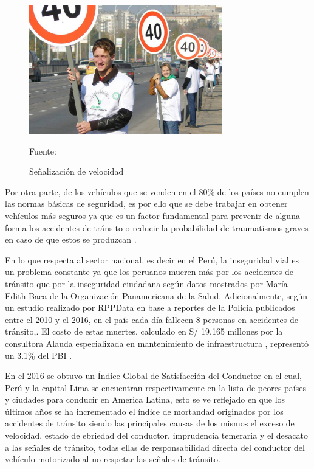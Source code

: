 	\vskip 0.15cm
	\begin{figure}[H]
	\begin{center}
	\includegraphics[width=0.75\textwidth]{images/intro/velocidad}
	\end{center}
	\begin{center}
	\caption{\small{Señalización de velocidad}}
	{\small{Fuente: \cite{OMS}}}
	\end{center}
	\vspace{-1.5em}
	\end{figure}
	
	Por otra parte, de los vehículos que se venden en el 80\% de los países no cumplen las normas básicas de seguridad, es por ello que se debe trabajar en obtener vehículos más seguros ya que es un factor fundamental para prevenir de alguna forma los accidentes de tránsito o reducir la probabilidad de traumatismos graves en caso de que estos se produzcan \citep{OMS}.
	
	\vskip 0.15cm
	En lo que respecta al sector nacional, es decir en el Perú, la inseguridad vial es un problema constante ya que los peruanos mueren más por los accidentes de tránsito que por la inseguridad ciudadana según datos mostrados por María Edith Baca de la Organización Panamericana de la Salud\citep{OPS}. Adicionalmente, según un estudio realizado por RPPData en base a reportes de la Policía publicados entre el 2010 y el 2016, en el país cada día fallecen 8 personas en accidentes de tránsito,\citep{RPPData}. El costo de estas muertes, calculado en S/ 19,165 millones por la consultora Alauda especializada en mantenimiento de infraestructura , representó un 3.1\% del PBI \citep{Gestion2}.  
	
	
	\vskip 0.15cm
	En el 2016 se obtuvo un Índice Global de Satisfacción del Conductor \citep{CNN} en el cual, Perú y la capital Lima se encuentran respectivamente en la lista de peores países y ciudades para conducir en America Latina, esto se ve reflejado en que los últimos años se ha incrementado el índice de mortandad originados por los accidentes de tránsito siendo las principales causas de los mismos el exceso de velocidad, estado de ebriedad del conductor, imprudencia temeraria y el desacato a las señales de tránsito, todas ellas de responsabilidad directa del conductor del vehículo motorizado al no respetar las señales de tránsito\citep{SUTRAN}. 
	
